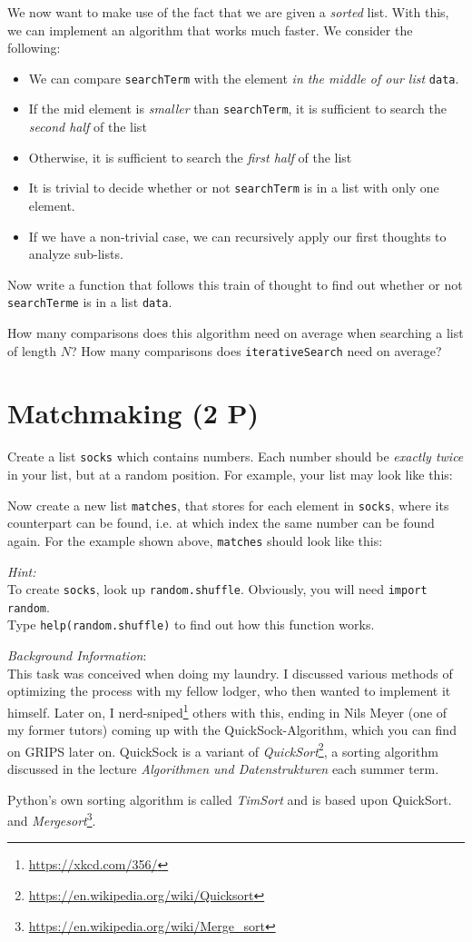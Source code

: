 \documentclass[
	ngerman,
	fontsize=10pt,
	parskip=half,
	titlepage=true,
	DIV=12
]{scrartcl}
\newcommand*{\inPy}[1]{\texttt{#1}}
\newcommand*{\ie}{i.\;e. }
\begin{document}
We now want to make use of the fact that we are given a \emph{sorted} list. With this, we can implement an algorithm that works much faster. We consider the following:
\begin{itemize}
\item We can compare \texttt{searchTerm} with the element \emph{in the middle of our list} \texttt{data}.
\item If the mid element is \emph{smaller} than \texttt{searchTerm}, it is sufficient to search the \emph{second half} of the list
\item Otherwise, it is sufficient to search the \emph{first half} of the list
\item It is trivial to decide whether or not \texttt{searchTerm} is in a list with only one element.
\item If we have a non-trivial case, we can recursively apply our first thoughts to analyze sub-lists.
\end{itemize}

Now write a function that follows this train of thought to find out whether or not \texttt{searchTerme} is in a list \texttt{data}.

How many comparisons does this algorithm need on average when searching a list of length $N$? How many comparisons does \texttt{iterativeSearch} need on average?


\section{Matchmaking (2 P)}
Create a list \texttt{socks} which contains numbers. Each number should be \emph{exactly twice} in your list, but at a random position. For example, your list may look like this:

Now create a new list \texttt{matches}, that stores for each element in \texttt{socks}, where its counterpart can be found, \ie at which index the same number can be found again. For the example shown above, \texttt{matches} should look like this:

\emph{Hint:}\\
To create \texttt{socks}, look up \texttt{random.shuffle}. Obviously, you will need \inPy{import random}.\\
Type \inPy{help(random.shuffle)} to find out how this function works.

\emph{Background Information}:\\
This task was conceived when doing my laundry. I discussed various methods of optimizing the process with my fellow lodger, who then wanted to implement it himself. Later on, I nerd-sniped\footnote{\url{https://xkcd.com/356/}} others with this, ending in Nils Meyer (one of my former tutors) coming up with the QuickSock-Algorithm, which you can find on GRIPS later on. QuickSock is a variant of \emph{QuickSort}\footnote{\url{https://en.wikipedia.org/wiki/Quicksort}}, a sorting algorithm discussed in the lecture \emph{Algorithmen und Datenstrukturen} each summer term.

Python's own sorting algorithm is called \emph{TimSort} and is based upon QuickSort. and \emph{Mergesort}\footnote{\url{https://en.wikipedia.org/wiki/Merge_sort}}.
\end{document}
